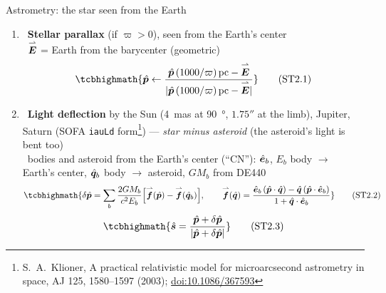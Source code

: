 \begin{frame}{Astrometry: the star seen from the Earth}
  \footnotesize\tightdisplays{}
  \setlength{\leftmargini}{1.4em}
  \begin{enumerate}\setlength{\itemsep}{0.4ex}\setcounter{enumi}{3}
    \item \OWN\ \textbf{Stellar parallax} (if $\varpi > 0$), seen from the Earth's center\\
          \SP\ $\overset{\rightharpoonup}{\bm{E}}$ = Earth from the barycenter (geometric)
          \[
            \tcbhighmath{\uv{p} \leftarrow \frac{\uv{p}\,(1000/\varpi)\,\mathrm{pc} - \vv{E}}{|\uv{p}\,(1000/\varpi)\,\mathrm{pc} - \vv{E}|}}
            \tag{ST2.1}
          \]
    \item \OWN\ \textbf{Light deflection} by the Sun (\SI{4}{mas} at \SI{90}{\degree}, $1.75''$ at the limb), Jupiter, Saturn
          (SOFA \texttt{iauLd} form\footnote{S.~A.~Klioner, A practical relativistic model for microarcsecond astrometry in
          space, AJ 125, 1580--1597 (2003); \href{https://doi.org/10.1086/367593}{doi:10.1086/367593}}) --- \emph{star minus asteroid}
          (the asteroid's light is bent too)\\
          \SP\ bodies and asteroid from the Earth's center (``CN''): $\hat{\bm{e}}_b$, $E_b$ body $\to$ Earth's center,
          $\hat{\bm{q}}_b$ body $\to$ asteroid, $GM_b$ from DE440
          \[
            \tcbhighmath{\delta\uv{p} = \sum_{b} \frac{2GM_b}{c^2 E_b}\Bigl[\vv{f}(\uv{p}) - \vv{f}(\uv{q}_b)\Bigr],
            \qquad
            \vv{f}(\uv{q}) = \frac{\uv{e}_b\,(\uv{p}\cdot\uv{q}) - \uv{q}\,(\uv{p}\cdot\uv{e}_b)}{1 + \uv{q}\cdot\uv{e}_b}}
            \tag{ST2.2}
          \]
          \[
            \tcbhighmath{\uv{s} = \frac{\uv{p} + \delta\uv{p}}{|\uv{p} + \delta\uv{p}|}}
            \tag{ST2.3}
          \]
  \end{enumerate}
\end{frame}


